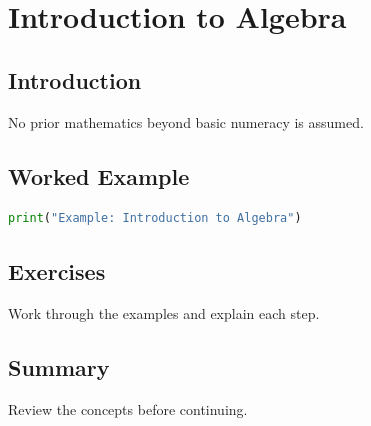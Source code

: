 \chapter{Introduction to Algebra}
\label{chap:vol4-3}



\section{Introduction}
No prior mathematics beyond basic numeracy is assumed.

\section{Worked Example}
\begin{lstlisting}[language=Python]
print("Example: Introduction to Algebra")
\end{lstlisting}

\section{Exercises}
\begin{exercise}
Work through the examples and explain each step.
\end{exercise}

\section{Summary}
Review the concepts before continuing.
